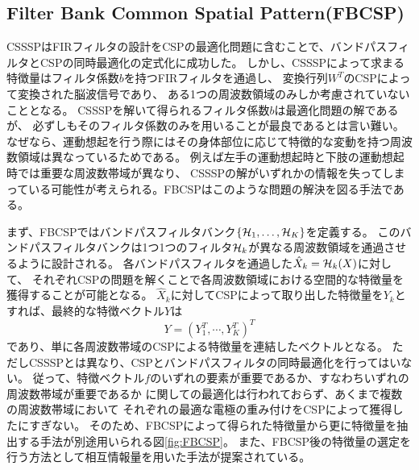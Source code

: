 \subsection{\rm Filter Bank Common Spatial Pattern(FBCSP)}
CSSSPはFIRフィルタの設計をCSPの最適化問題に含むことで、バンドパスフィルタとCSPの同時最適化の定式化に成功した。
しかし、CSSSPによって求まる特徴量はフィルタ係数\(b\)を持つFIRフィルタを通過し、
変換行列\(W^T\)のCSPによって変換された脳波信号であり、
ある1つの周波数領域のみしか考慮されていないこととなる。
CSSSPを解いて得られるフィルタ係数\(b\)は最適化問題の解であるが、
必ずしもそのフィルタ係数のみを用いることが最良であるとは言い難い。
なぜなら、運動想起を行う際にはその身体部位に応じて特徴的な変動を持つ周波数領域は異なっているためである。
例えば左手の運動想起時と下肢の運動想起時では重要な周波数帯域が異なり、
CSSSPの解がいずれかの情報を失ってしまっている可能性が考えられる。FBCSPはこのような問題の解決を図る手法である\cite{fbcsp}。

まず、FBCSPではバンドパスフィルタバンク\(\{ {\cal H}_1, \ldots, {\cal H}_K \}\)を定義する。
このバンドパスフィルタバンクは1つ1つのフィルタ\({\cal H}_k\)が異なる周波数領域を通過させるように設計される。
各バンドパスフィルタを通過した\(\hat X_k = {\cal H}_k(X)\)に対して、
それぞれCSPの問題を解くことで各周波数領域における空間的な特徴量を獲得することが可能となる。
\({\hat X}_k\)に対してCSPによって取り出した特徴量を\(Y_k\)とすれば、最終的な特徴ベクトル\(Y\)は
\begin{equation}
    Y = (Y_1^T,\cdots, Y_K^T)^T
\end{equation}
であり、単に各周波数帯域のCSPによる特徴量を連結したベクトルとなる。
ただしCSSSPとは異なり、CSPとバンドパスフィルタの同時最適化を行ってはいない。
従って、特徴ベクトル\(f\)のいずれの要素が重要であるか、すなわちいずれの周波数帯域が重要であるか
に関しての最適化は行われておらず、あくまで複数の周波数帯域において
それぞれの最適な電極の重み付けをCSPによって獲得したにすぎない。
そのため、FBCSPによって得られた特徴量から更に特徴量を抽出する手法が別途用いられる図\ref{fig:FBCSP}。
また、FBCSP後の特徴量の選定を行う方法として相互情報量を用いた手法が提案されている\cite{fbcspBCICOMPE}。

